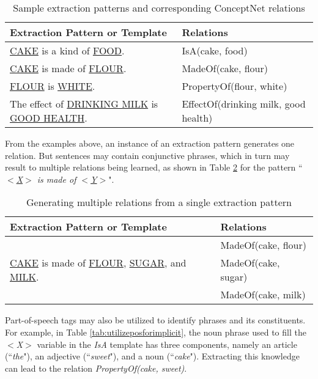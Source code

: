 \begin{table}[ht]   %
\centering
\caption{Sample extraction patterns and corresponding ConceptNet relations} \vspace{0.25em}
\begin{tabular}{|p{7cm}|l|} \hline
Extraction Pattern or Template & Relations \\ \hline
\underline{CAKE} is a kind of \underline{FOOD}. & IsA(cake, food) \\ \hline
\underline{CAKE} is made of \underline{FLOUR}. & MadeOf(cake, flour) \\ \hline
\underline{FLOUR} is \underline{WHITE}. & PropertyOf(flour, white) \\ \hline
The effect of \underline{DRINKING MILK} is \underline{GOOD HEALTH}. & EffectOf(drinking milk, good health) \\ \hline
\end{tabular}
\label{tab:patternsamples}
\end{table}

From the examples above, an instance of an extraction pattern generates one relation. But sentences may contain conjunctive phrases, which in turn may result to multiple relations being learned, as shown in Table \ref{tab:multiplerelationssingle} for the pattern ``\textit{\underline{$<$X$>$} is made of \underline{$<$Y$>$}}".

\begin{table}[ht]   %
\centering
\caption{Generating multiple relations from a single extraction pattern} \vspace{0.25em}
\begin{tabular}{|l|l|} \hline
Extraction Pattern or Template & Relations \\ \hline
\multirow{3}{*}{\underline{CAKE} is made of \underline{FLOUR}, \underline{SUGAR}, and \underline{MILK}.} & MadeOf(cake, flour) \\
 & MadeOf(cake, sugar) \\
 & MadeOf(cake, milk) \\ \hline
\end{tabular}
\label{tab:multiplerelationssingle}
\end{table}

Part-of-speech tags may also be utilized to identify phrases and its constituents. For example, in Table \ref{tab:utilizeposforimplicit}, the noun phrase used to fill the \textit{$<$X$>$} variable in the \textit{IsA} template has three components, namely an article (``\textit{the}"), an adjective (``\textit{sweet}"), and a noun (``\textit{cake}"). Extracting this knowledge can lead to the relation \textit{PropertyOf(cake, sweet)}. 

